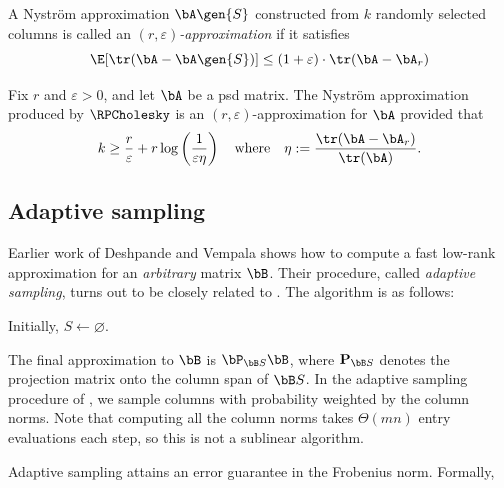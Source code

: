 \begin{definition}
    \label{def:r-epsilon}
    A Nystr\"om approximation $\bA\gen{S}$ constructed from $k$ randomly selected columns is called an \textit{$(r, \varepsilon)$-approximation} if it satisfies
    \[\E[\tr(\bA - \bA\gen{S})] \leq (1+\varepsilon)\cdot \tr(\bA -
        \bA_r)\]
\end{definition}



\begin{theorem}{\cite{chen_randomly_2025}}
    \label{thm:rpc-error}
    Fix $r$ and $\varepsilon > 0$, and let $\bA$ be a psd matrix. The Nystr\"om approximation produced by $\RPCholesky$ is an $(r, \varepsilon)$-approximation for $\bA$ provided that
    \[k \geq \frac{r}{\varepsilon} + r\log\left(\frac{1}{\varepsilon\eta}\right)\quad\text{where}\quad \eta := \frac{\tr(\bA - \bA_r)}{\tr(\bA)}.\]
\end{theorem}

\subsection{Adaptive sampling}
Earlier work of Deshpande and Vempala \cite{deshpande_adaptive_2006} shows how to compute a fast low-rank approximation for an \textit{arbitrary} matrix $\bB$. Their procedure, called \textit{adaptive sampling}, turns out to be closely related to \RPCholesky. The algorithm is as follows:

\begin{algorithm}[H]
    \label{alg:adaptive-sampling}
    \DontPrintSemicolon
    \caption{Adaptive sampling}
    Initially, $S\gets \varnothing$.\;
\end{algorithm}

\vspace{1em}
\noindent
The final approximation to $\bB$ is $\bP_{\bB S}\bB$, where $\mathbf{P}_{\bB S}$ denotes the projection matrix onto the column span of $\bB S$. In the adaptive sampling procedure of \cite{deshpande_adaptive_2006}, we sample columns with probability weighted by the column norms. Note that computing all the column norms takes $\Theta(mn)$ entry evaluations each step, so this is not a sublinear algorithm. 

Adaptive sampling attains an error guarantee in the Frobenius norm. Formally,

